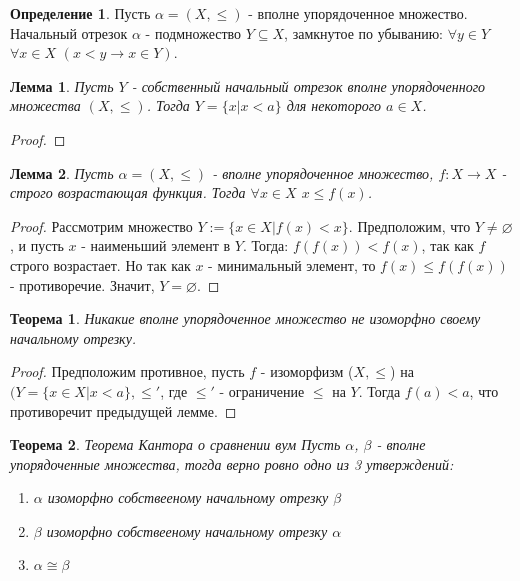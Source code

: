 \documentclass[a4paper, 12pt]{article}
\theoremstyle{definition}
\newtheorem*{definition}{Определение}
\theoremstyle{plain}
\newtheorem*{theorem}{Теорема}
\newtheorem*{lemma}{Лемма}
\theoremstyle{remark}
\begin{document}
  \begin{definition}
    Пусть $\alpha=(X,\leqslant)$ - вполне упорядоченное множество. Начальный отрезок $\alpha$ - подмножество $Y\subseteq X$, замкнутое по убыванию: $\forall y\in Y$ $\forall x\in X$ $(x<y\to x\in Y)$.
  \end{definition}
  \begin{lemma}
    Пусть $Y$ - собственный начальный отрезок вполне упорядоченного множества $(X,\leqslant)$. Тогда $Y=\{x|x<a\}$ для некоторого $a\in X$.
  \end{lemma}
  \begin{proof}
    
  \end{proof}
  \begin{lemma}
    Пусть $\alpha=(X,\leqslant)$ - вполне упорядоченное множество, $f:X\to X$ - строго возрастающая функция. Тогда $\forall x\in X$ $x\leqslant f(x)$.
  \end{lemma}
  \begin{proof}
    Рассмотрим множество $Y:=\{x\in X|f(x)<x\}$. Предположим, что $Y\neq\varnothing$, и пусть $x$ - наименьший элемент в $Y$. Тогда: $f(f(x))<f(x)$, так как $f$ строго возрастает. Но так как $x$ - минимальный элемент, то $f(x)\leqslant f(f(x))$ - противоречие. Значит, $Y=\varnothing$.
  \end{proof}
  \begin{theorem}
    Никакие вполне упорядоченное множество не изоморфно своему начальному отрезку.
  \end{theorem}
  \begin{proof}
    Предположим противное, пусть $f$ - изоморфизм ($X,\leqslant$) на $(Y=\{x\in X|x < a\},\leqslant'$, где $\leqslant'$ - ограничение $\leqslant$ на $Y$. Тогда $f(a)<a$, что противоречит предыдущей лемме.
  \end{proof}
  \begin{theorem}{Теорема Кантора о сравнении вум}
    Пусть $\alpha$, $\beta$ - вполне упорядоченные множества, тогда верно ровно одно из 3 утверждений:
    \begin{enumerate}
      \item $\alpha$ изоморфно собствееному начальному отрезку $\beta$
      \item $\beta$ изоморфно собствееному начальному отрезку $\alpha$
      \item $\alpha\cong\beta$
    \end{enumerate}
  \end{theorem}
\end{document}

